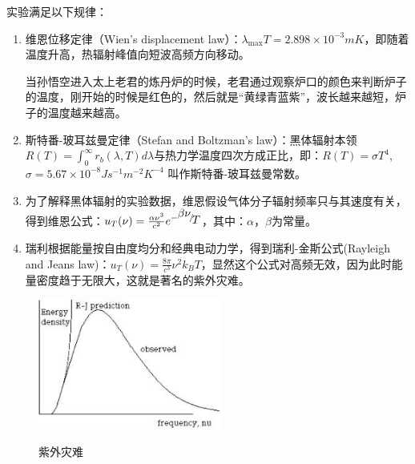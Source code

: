 实验满足以下规律：



\begin{enumerate}
    \item {维恩位移定律（Wien's displacement law）：$\lambda _{\max } T = 2.898 \times 10^{-3} m K$，即随着温度升高，热辐射峰值向短波高频方向移动。

当孙悟空进入太上老君的炼丹炉的时候，老君通过观察炉口的颜色来判断炉子的温度，刚开始的时候是红色的，然后就是“黄绿青蓝紫”，波长越来越短，炉子的温度越来越高。}

    \item {斯特番-玻耳兹曼定律（Stefan and Boltzman's law）：黑体辐射本领$R(T) = \int_0^\infty  {r_b (\lambda ,T)d\lambda } $与热力学温度四次方成正比，即：$R(T) = \sigma T^4 $, $\sigma  = 5.67 \times 10^{ - 8} Js^{ - 1} m^{ - 2} K^{ - 4} $
叫作斯特番-玻耳兹曼常数。}

    \item {为了解释黑体辐射的实验数据，维恩假设气体分子辐射频率只与其速度有关，得到维恩公式：$u_T (\nu ) = \frac{{\alpha \nu ^3 }}{{c^2 }}e^{ - {\raise0.7ex\hbox{${\beta \nu }$} \!\mathord{\left/
 {\vphantom {{\beta \nu } T}}\right.\kern-\nulldelimiterspace}
\!\lower0.7ex\hbox{$T$}}} $，其中：$\alpha$，$\beta$为常量。}

    \item {瑞利根据能量按自由度均分和经典电动力学，得到瑞利-金斯公式(Rayleigh and Jeans law)：$u_T (\nu ) = \frac{{8\pi }}{{c^3 }}\nu ^2 k_B T$，显然这个公式对高频无效，因为此时能量密度趋于无限大，这就是著名的紫外灾难。}
\end{enumerate}




\begin{figure}[h]
\begin{center}
  \includegraphics[width=6cm]{Duality/2-4.ps}\\
  \caption{紫外灾难}\label{Rayleigh & Jeans law}
\end{center}
\end{figure}

